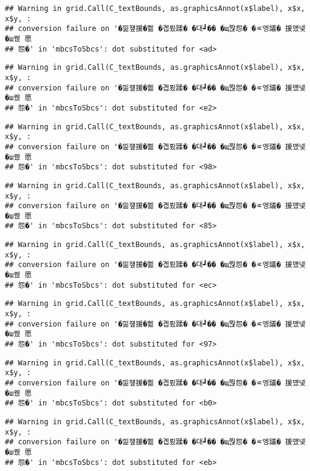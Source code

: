 \documentclass[
]{article}
\begin{document}
\begin{verbatim}
## Warning in grid.Call(C_textBounds, as.graphicsAnnot(x$label), x$x, x$y, :
## conversion failure on '�낆쟾援�쁾 �곕룄蹂� �대┛�� �щ쭩怨� �ㅼ엥議� 援먰넻�ш퀬 愿
## 怨�' in 'mbcsToSbcs': dot substituted for <ad>
\end{verbatim}

\begin{verbatim}
## Warning in grid.Call(C_textBounds, as.graphicsAnnot(x$label), x$x, x$y, :
## conversion failure on '�낆쟾援�쁾 �곕룄蹂� �대┛�� �щ쭩怨� �ㅼ엥議� 援먰넻�ш퀬 愿
## 怨�' in 'mbcsToSbcs': dot substituted for <e2>
\end{verbatim}

\begin{verbatim}
## Warning in grid.Call(C_textBounds, as.graphicsAnnot(x$label), x$x, x$y, :
## conversion failure on '�낆쟾援�쁾 �곕룄蹂� �대┛�� �щ쭩怨� �ㅼ엥議� 援먰넻�ш퀬 愿
## 怨�' in 'mbcsToSbcs': dot substituted for <98>
\end{verbatim}

\begin{verbatim}
## Warning in grid.Call(C_textBounds, as.graphicsAnnot(x$label), x$x, x$y, :
## conversion failure on '�낆쟾援�쁾 �곕룄蹂� �대┛�� �щ쭩怨� �ㅼ엥議� 援먰넻�ш퀬 愿
## 怨�' in 'mbcsToSbcs': dot substituted for <85>
\end{verbatim}

\begin{verbatim}
## Warning in grid.Call(C_textBounds, as.graphicsAnnot(x$label), x$x, x$y, :
## conversion failure on '�낆쟾援�쁾 �곕룄蹂� �대┛�� �щ쭩怨� �ㅼ엥議� 援먰넻�ш퀬 愿
## 怨�' in 'mbcsToSbcs': dot substituted for <ec>
\end{verbatim}

\begin{verbatim}
## Warning in grid.Call(C_textBounds, as.graphicsAnnot(x$label), x$x, x$y, :
## conversion failure on '�낆쟾援�쁾 �곕룄蹂� �대┛�� �щ쭩怨� �ㅼ엥議� 援먰넻�ш퀬 愿
## 怨�' in 'mbcsToSbcs': dot substituted for <97>
\end{verbatim}

\begin{verbatim}
## Warning in grid.Call(C_textBounds, as.graphicsAnnot(x$label), x$x, x$y, :
## conversion failure on '�낆쟾援�쁾 �곕룄蹂� �대┛�� �щ쭩怨� �ㅼ엥議� 援먰넻�ш퀬 愿
## 怨�' in 'mbcsToSbcs': dot substituted for <b0>
\end{verbatim}

\begin{verbatim}
## Warning in grid.Call(C_textBounds, as.graphicsAnnot(x$label), x$x, x$y, :
## conversion failure on '�낆쟾援�쁾 �곕룄蹂� �대┛�� �щ쭩怨� �ㅼ엥議� 援먰넻�ш퀬 愿
## 怨�' in 'mbcsToSbcs': dot substituted for <eb>
\end{verbatim}
\end{document}
